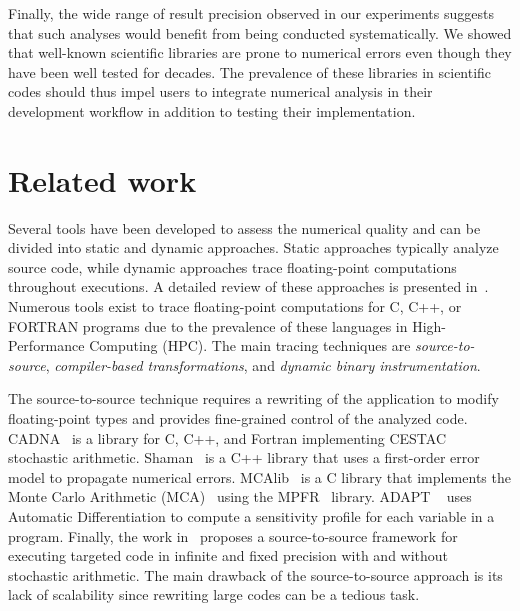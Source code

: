 \documentclass[10pt,journal,compsoc]{IEEEtran}
\newcommand{\pytracer}[0]{PyTracer\xspace}
\DeclareRobustCommand{\add}[1]{\textcolor{ao(english)}{#1}}%
\DeclareRobustCommand{\add}[1]{#1}
\begin{document}
Finally, the wide range of result precision observed in our experiments
suggests that such
analyses would benefit from being conducted systematically. We showed that
well-known scientific libraries are prone to numerical errors even though they
have been well tested for decades. The prevalence of these libraries in
scientific codes should thus impel users to integrate numerical analysis in
their development workflow in addition to testing their implementation.

\section{Related work}

Several tools have been developed to assess the numerical quality and can be
divided into static and dynamic approaches. Static approaches typically analyze
source code, while dynamic approaches trace floating-point computations
throughout executions. A detailed review of these approaches is presented
in~\cite{cherubin2020tools}. 
Numerous tools exist to trace floating-point computations for C, C++, or
FORTRAN programs due to the prevalence of these languages in High-Performance
Computing (HPC). The main tracing techniques are \textit{source-to-source},
\textit{compiler-based transformations}, and \textit{dynamic binary
    instrumentation}.

The source-to-source technique requires a rewriting of the application to modify
floating-point types and provides fine-grained control of the analyzed code.
CADNA~\cite{jezequel2008cadna} is a library for C, C++, and Fortran implementing
CESTAC~\cite{vignes1993stochastic} stochastic arithmetic.
Shaman~\cite{demeure_phd} is a C++ library that uses a first-order error model
to propagate numerical errors. MCAlib~\cite{frechtling2015mcalib} is a C library
that implements the Monte Carlo Arithmetic (MCA)~\cite{parker1997monte} using
the MPFR~\cite{fousse2007mpfr} library. ADAPT \mbox{~\cite{menon2018adapt}} uses
Automatic Differentiation to compute a sensitivity profile for each variable in a
program. Finally, the work in~\cite{tang2016software} propose\add{s} a
source-to-source framework for executing targeted code in infinite and fixed
precision with and without stochastic arithmetic. The main drawback of the
source-to-source approach is its lack of scalability since rewriting large
codes can be a tedious task.
\end{document}
